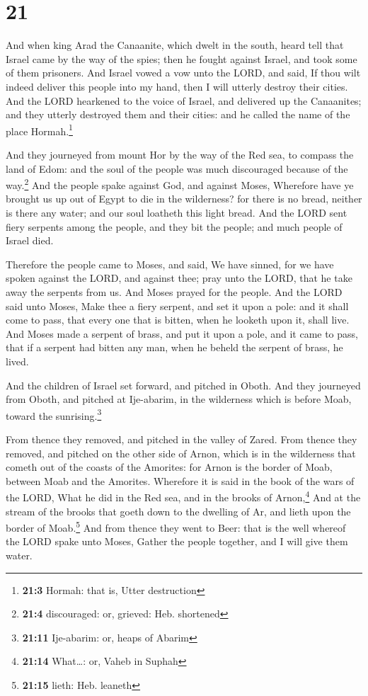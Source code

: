 \hypertarget{section-20}{%
\section{21}\label{section-20}}

 And when king Arad the Canaanite, which dwelt in the
south, heard tell that Israel came by the way of the spies; then he
fought against Israel, and took some of them prisoners. 
And Israel vowed a vow unto the LORD, and said, If thou wilt indeed
deliver this people into my hand, then I will utterly destroy their
cities.  And the LORD hearkened to the voice of Israel,
and delivered up the Canaanites; and they utterly destroyed them and
their cities: and he called the name of the place Hormah.\footnote{\textbf{21:3}
  Hormah: that is, Utter destruction}

 And they journeyed from mount Hor by the way of the Red
sea, to compass the land of Edom: and the soul of the people was much
discouraged because of the way.\footnote{\textbf{21:4} discouraged: or,
  grieved: Heb. shortened}  And the people spake against
God, and against Moses, Wherefore have ye brought us up out of Egypt to
die in the wilderness? for there is no bread, neither is there any
water; and our soul loatheth this light bread.  And the
LORD sent fiery serpents among the people, and they bit the people; and
much people of Israel died.

 Therefore the people came to Moses, and said, We have
sinned, for we have spoken against the LORD, and against thee; pray unto
the LORD, that he take away the serpents from us. And Moses prayed for
the people.  And the LORD said unto Moses, Make thee a
fiery serpent, and set it upon a pole: and it shall come to pass, that
every one that is bitten, when he looketh upon it, shall live.
 And Moses made a serpent of brass, and put it upon a
pole, and it came to pass, that if a serpent had bitten any man, when he
beheld the serpent of brass, he lived.

 And the children of Israel set forward, and pitched in
Oboth.  And they journeyed from Oboth, and pitched at
Ije-abarim, in the wilderness which is before Moab, toward the
sunrising.\footnote{\textbf{21:11} Ije-abarim: or, heaps of Abarim}

 From thence they removed, and pitched in the valley of
Zared.  From thence they removed, and pitched on the
other side of Arnon, which is in the wilderness that cometh out of the
coasts of the Amorites: for Arnon is the border of Moab, between Moab
and the Amorites.  Wherefore it is said in the book of
the wars of the LORD, What he did in the Red sea, and in the brooks of
Arnon,\footnote{\textbf{21:14} What\ldots: or, Vaheb in Suphah}
 And at the stream of the brooks that goeth down to the
dwelling of Ar, and lieth upon the border of Moab.\footnote{\textbf{21:15}
  lieth: Heb. leaneth}  And from thence they went to
Beer: that is the well whereof the LORD spake unto Moses, Gather the
people together, and I will give them water.

